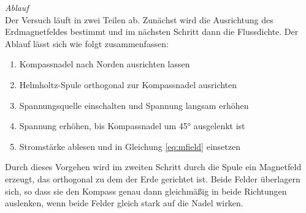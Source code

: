 \textit{Ablauf}\\
Der Versuch läuft in zwei Teilen ab. Zunächst wird die Ausrichtung des Erdmagnetfeldes bestimmt und im nächsten Schritt dann die Flussdichte. Der Ablauf lässt sich wie folgt zusammenfassen:
\begin{enumerate}
	\setlength{\itemsep}{-2pt}
	\item Kompassnadel nach Norden ausrichten lassen
	\item Helmholtz-Spule orthogonal zur Kompassnadel ausrichten
	\item Spannungsquelle einschalten und Spannung langsam erhöhen
	\item Spannung erhöhen, bis Kompassnadel um 45° ausgelenkt ist
	\item Stromstärke ablesen und in Gleichung \eqref{eq:mfield} einsetzen
\end{enumerate}

Durch dieses Vorgehen wird im zweiten Schritt durch die Spule ein Magnetfeld erzeugt, das orthogonal zu dem der Erde gerichtet ist. Beide Felder überlagern sich, so dass sie den Kompass genau dann gleichmäßig in beide Richtungen auslenken, wenn beide Felder gleich stark auf die Nadel wirken.